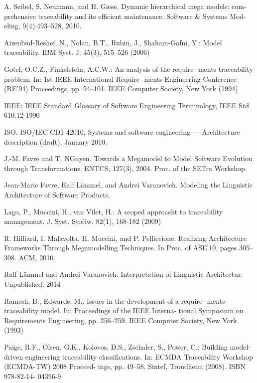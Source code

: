 \documentclass[runningheads,a4paper]{llncs}
\begin{document}
\begin{thebibliography}{1}

A. Seibel, S. Neumann, and H. Giese. Dynamic hierarchical mega models: com- prehensive traceability and its efficient maintenance. Software \& Systems Mod- eling, 9(4):493–528, 2010.

Aizenbud-Reshef, N., Nolan, B.T., Rubin, J., Shaham-Gafni, Y.:
Model traceability. IBM Syst. J. 45(3), 515–526 (2006)


Gotel, O.C.Z., Finkelstein, A.C.W.: An analysis of the require-
ments traceability problem. In: 1st IEEE International Require-
ments Engineering Conference (RE’94) Proceedings, pp. 94–101.
IEEE Computer Society, New York (1994)

IEEE: IEEE Standard Glossary of Software Engineering Terminology, IEEE Std 610.12-1990

ISO. ISO/IEC CD1 42010, Systems and software engineering
— Architecture description (draft), January 2010.

J.-M. Favre and T. NGuyen. Towards a Megamodel to Model Software Evolution through Transformations. ENTCS, 127(3), 2004. Proc. of the SETra Workshop.

Jean-Marie Favre, Ralf Lämmel, and Andrei Varanovich. Modeling the Linguistic Architecture of Software Products.

Lago, P., Muccini, H., van Vilet, H.: A scoped approacht to traceability management. J. Syst. Stoftw. 82(1), 168-182 (2009)

R. Hilliard, I. Malavolta, H. Muccini, and P. Pelliccione. Realizing Architecture Frameworks Through Megamodelling Techniques. In Proc. of ASE’10, pages 305–308. ACM, 2010.

Ralf Lämmel and Andrei Varanovich. Interpretation of Linguistic Architectur. Unpublished, 2014

Ramesh, B., Edwards, M.: Issues in the development of a require-
ments traceability model. In: Proceedings of the IEEE Interna-
tional Symposium on Requirements Engineering, pp. 256–259.
IEEE Computer Society, New York (1993)

Paige, R.F., Olsen, G.K., Kolovos, D.S., Zschaler, S., Power, C.:
Building model-driven engineering traceability classifications. In:
ECMDA Traceability Workshop (ECMDA-TW) 2008 Proceed-
ings, pp. 49–58. Sintef, Trondheim (2008). ISBN 978-82-14-
04396-9


\end{thebibliography}
\end{document}
